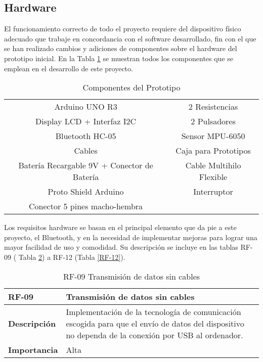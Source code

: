 \subsection{Hardware}
El funcionamiento correcto de todo el proyecto requiere del dispositivo físico adecuado que trabaje en concordancia con el software desarrollado, fin con el que se han realizado cambios y adiciones de componentes sobre el hardware del prototipo inicial. En la Tabla \ref{tab:componentes} se muestran todos los componentes que se emplean en el desarrollo de este proyecto.

\begin{table}[]
    \begin{tabular}{|c|c|}
    \hline
    \rowcolor[HTML]{FFFFFF} 
    \multicolumn{2}{|c|}{\cellcolor[HTML]{FFFFFF}\textbf{Componentes}} \\ \hline 
    \rowcolor[HTML]{EFEFEF} 
    Arduino UNO R3 & 2 Resistencias \\ \hline
    \rowcolor[HTML]{FFFFFF} 
    Display LCD + Interfaz I2C & 2 Pulsadores \\ \hline
    \rowcolor[HTML]{EFEFEF} 
    Bluetooth HC-05 & Sensor MPU-6050 \\ \hline
    \rowcolor[HTML]{FFFFFF} 
    Cables & Caja para Prototipos \\ \hline
    \rowcolor[HTML]{EFEFEF} 
    Batería Recargable 9V + Conector de Batería & Cable Multihilo Flexible \\ \hline
    \rowcolor[HTML]{FFFFFF} 
    Proto Shield Arduino & Interruptor \\ \hline
    \rowcolor[HTML]{EFEFEF} 
    Conector 5 pines macho-hembra & \\ \hline
    \end{tabular}
    \caption{Componentes del Prototipo}
    \label{tab:componentes}
\end{table}



Los requisitos hardware se basan en el principal elemento que da pie a este proyecto, el Bluetooth, y en la necesidad de implementar mejoras para lograr una mayor facilidad de uso y comodidad. Su descripción se incluye en las tablas RF-09 ( Tabla \ref{RF-09}) a RF-12 (Tabla \ref{RF-12}).

\begin{table}[p]
    \centering
    \begin{tabularx}{\linewidth}{ p{} p{} }
        \toprule
        \textbf{RF-09}    & \textbf{Transmisión de datos sin cables}\\
        \toprule
        \textbf{Descripción}              & Implementación de la tecnología de comunicación escogida para que el envío de datos del dispositivo no dependa de la conexión por USB al ordenador.  \\
        \textbf{Importancia}                & Alta \\
        \bottomrule
    \end{tabularx}
    \caption{RF-09 Transmisión de datos sin cables}
    \label{RF-09}
\end{table}

